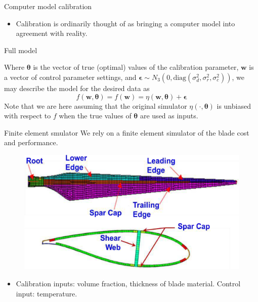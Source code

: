 \documentclass[final]{beamer}
\newlength{\onecolwid}
\begin{document}
\begin{frame}[t]
\begin{columns}[t]
\begin{column}{\onecolwid}
\begin{alertblock}{Computer model calibration}
\begin{itemize}
\item Calibration is ordinarily thought of as bringing a computer model into agreement with reality.

\end{itemize}

\end{alertblock}


\begin{alertblock}{Full model}

Where $\boldsymbol \theta$ is the vector of true (optimal) values of the calibration parameter, $\mathbf w$ is a vector of control parameter settings, and $\boldsymbol \epsilon\sim N_3(0,\mathrm{diag}(\sigma^2_d,\sigma^2_r,\sigma^2_c))$, we may describe the model for the desired data as
\[
f(\mathbf w,\boldsymbol \theta) = f(\mathbf w) = \eta(\mathbf w,\boldsymbol \theta) + \boldsymbol \epsilon
\]
Note that we are here assuming that the original simulator $\eta(\cdot,\boldsymbol\theta)$ is unbiased with respect to $f$ when the true values of $\boldsymbol\theta$ are used as inputs.

\end{alertblock} 



\begin{alertblock}{Finite element smulator}
We rely on a finite element simulator of the blade cost and performance.

\begin{figure}[h!]
\includegraphics[width=0.6\linewidth]{blade3}
\label{blade}
\end{figure}

\vspace{-18mm}
\begin{itemize}
\item Calibration inputs: volume fraction, thickness of blade material. Control input: temperature.


\end{itemize}
\end{alertblock}
\end{column}
\end{columns}
\end{frame}
\end{document}
